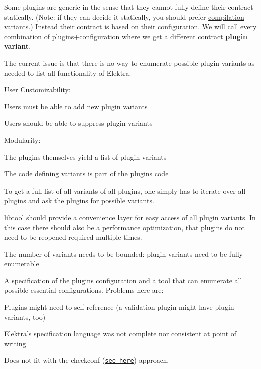 Some plugins are generic in the sense that they cannot fully define their contract statically. (Note\+: if they can decide it statically, you should prefer \hyperlink{doc_tutorials_compilation-variants_md}{compilation variants}.) Instead their contract is based on their configuration. We will call every combination of plugins+configuration where we get a different contract {\bfseries plugin variant}.

The current issue is that there is no way to enumerate possible plugin variants as needed to list all functionality of Elektra.


\begin{DoxyItemize}
\item User Customizability\+:
\begin{DoxyItemize}
\item Users must be able to add new plugin variants
\item Users should be able to suppress plugin variants
\end{DoxyItemize}
\item Modularity\+:
\begin{DoxyItemize}
\item The plugins themselves yield a list of plugin variants
\item The code defining variants is part of the plugin\textquotesingle{}s code
\item To get a full list of all variants of all plugins, one simply has to iterate over all plugins and ask the plugins for possible variants.
\end{DoxyItemize}
\item libtool should provide a convenience layer for easy access of all plugin variants. In this case there should also be a performance optimization, that plugins do not need to be reopened required multiple times.
\end{DoxyItemize}


\begin{DoxyItemize}
\item The number of variants needs to be bounded\+: plugin variants need to be fully enumerable
\end{DoxyItemize}

A specification of the plugin\textquotesingle{}s configuration and a tool that can enumerate all possible essential configurations. Problems here are\+:


\begin{DoxyItemize}
\item Plugins might need to self-\/reference (a validation plugin might have plugin variants, too)
\item Elektra’s specification language was not complete nor consistent at point of writing
\item Does not fit with the {\ttfamily checkconf} (\href{https://git.libelektra.org/issues/559}{\tt see here}) approach.
\end{DoxyItemize}

